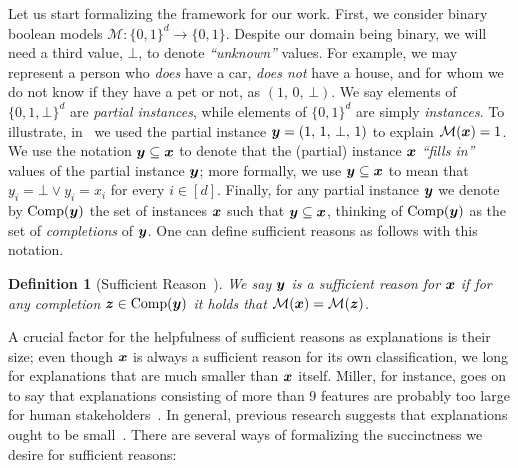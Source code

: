 \documentclass[11pt, letterpaper]{article}
\newtheorem{definition}{Definition}
\newcommand{\M}{\mathcal{M}}
\DeclareMathOperator{\comp}{Comp}
\begin{document}
Let us start formalizing the framework for our work.  First, we consider binary boolean models $\M\colon \{0, 1\}^d \to \{0, 1\}$. Despite our domain being binary, we will need a third value, $\bot$, to denote \emph{``unknown''} values.  For example, we may represent a person who \emph{does} have a car, \emph{does not} have a house, and for whom we do not know if they have a pet or not, as $\left(1, \, 0, \, \bot\right)$. 
We say elements of $\{0, 1, \bot\}^d$ are \emph{partial instances}, while elements of $\{0, 1\}^d$ are simply \emph{instances}. To illustrate, in~ we used the partial instance ${\bm{y}} = \left(1, \, 1, \, \bot, \, 1 \right)$ to explain $\M(\vx) = 1$.
We use the notation ${\bm{y}} \subseteq {\bm{x}}$ to denote that the (partial) instance ${\bm{x}}$ \emph{``fills in''} values of the partial instance ${\bm{y}}$; more formally, we use ${\bm{y}} \subseteq {\bm{x}}$ to mean that $y_i = \bot \lor y_i = x_i$ for every $i \in [d]$. Finally, for any partial instance ${\bm{y}}$ we denote by $\comp(\vy)$ the set of instances ${\bm{x}}$ such that ${\bm{y}} \subseteq {\bm{x}}$, thinking of $\comp(\vy)$ as the set of \emph{completions} of ${\bm{y}}$. One can define sufficient reasons as follows with this notation.

\begin{definition}[Sufficient Reason~\cite{Darwiche_Hirth_2020}]
	We say ${\bm{y}}$ is a \emph{sufficient reason} for ${\bm{x}}$ if for any completion $\vz \in \comp(\vy)$ it holds that $\M(\vx) = \M(\vz)$.
	\label{def:sufficient-reason}
\end{definition}
A crucial factor for the helpfulness of sufficient reasons as explanations is their size; even though ${\bm{x}}$ is always a sufficient reason for its own classification, we long for explanations that are much smaller than ${\bm{x}}$ itself. Miller, for instance, goes on to say that explanations consisting of more than $9$ features are probably too large for human stakeholders~\cite{millerMagicalNumberSeven1956}. In general, previous research suggests that explanations ought to be small~\cite{Narayanan_Chen_He_Kim_Gershman_Doshi-Velez_2018, Lage_Chen_He_Narayanan_Kim_Gershman_Doshi-Velez_2019}.
There are several ways of formalizing the succinctness we desire for sufficient reasons:
\end{document}
